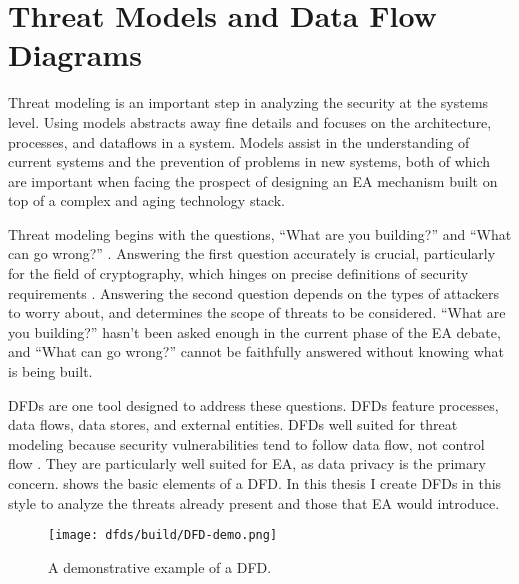 \section{Threat Models and Data Flow Diagrams}
\label{sec-threat-model-intro}

Threat modeling is an important step in analyzing the security at the systems level. Using models abstracts away fine
details and focuses on the architecture, processes, and dataflows in a system. Models assist in the understanding of
current systems and the prevention of problems in new systems, both of which are important when facing the prospect of
designing an \ac{EA} mechanism built on top of a complex and aging technology stack.

Threat modeling begins with the questions, ``What are you building?'' and ``What can go wrong?''
\cite{shostack_threat_2014}. Answering the first question accurately is crucial, particularly for the field of
cryptography, which hinges on precise definitions of security requirements \cite{varia_2018}. Answering the second
question depends on the types of attackers to worry about, and determines the scope of threats to be considered. ``What
are you building?'' hasn't been asked enough in the current phase of the \ac{EA} debate, and ``What can go wrong?''
cannot be faithfully answered without knowing what is being built.

\Acp{DFD} are one tool designed to address these questions. \Acp{DFD} feature processes, data flows, data stores, and
external entities. \Acp{DFD} well suited for threat modeling because security vulnerabilities tend to follow data flow,
not control flow \cite{shostack_threat_2014}. They are particularly well suited for \ac{EA}, as data privacy is the
primary concern.  shows the basic elements of a \ac{DFD}. In this thesis I create \acp{DFD} in this
style to analyze the threats already present and those that \ac{EA} would introduce.

\begin{figure}[ht]
    \centering\CaptionFontSize
    \texttt{[image: dfds/build/DFD-demo.png]}
    \caption[\Acs{DFD} Demo]{A demonstrative example of a \acf{DFD}.}
    \label{fig-dfd-demo}
\end{figure}

